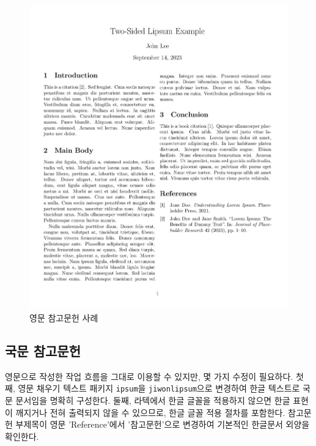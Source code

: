 \documentclass[
  letterpaper,
]{book}
\begin{document}
\begin{figure}

{\centering \includegraphics{images/pdf_english_reference.jpg}

}

\caption{영문 참고문헌 사례}

\end{figure}

\hypertarget{uxad6duxbb38-uxcc38uxace0uxbb38uxd5cc}{%
\subsection{국문 참고문헌}\label{uxad6duxbb38-uxcc38uxace0uxbb38uxd5cc}}

영문으로 작성한 작업 흐름을 그대로 이용할 수 있지만, 몇 가지 수정이
필요하다. 첫째, 영문 채우기 텍스트 패키지 \texttt{ipsum}을
\texttt{jiwonlipsum}으로 변경하여 한글 텍스트로 국문 문서임을 명확히
구성한다. 둘째, 라텍에서 한글 글꼴을 적용하지 않으면 한글 표현이
깨지거나 전혀 출력되지 않을 수 있으므로, 한글 글꼴 적용 절차를 포함한다.
참고문헌 부제목이 영문 'Reference'에서 '참고문헌'으로 변경하여 기본적인
한글문서 외양을 확인한다.
\end{document}
